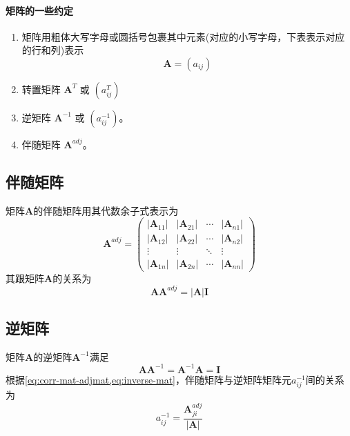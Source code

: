 \paragraph*{矩阵的一些约定}
\begin{enumerate}
    \item 矩阵用粗体大写字母或圆括号包裹其中元素(对应的小写字母，下表表示对应的行和列)表示
        \begin{equation}
            \bm{A} = (a_{ij})
        \end{equation}
    \item 转置矩阵 $\bm{A}^{T}$ 或 $(a^{T}_{ij})$
    \item 逆矩阵 $\bm{A}^{-1}$ 或 $(a^{-1}_{ij})$。
    \item 伴随矩阵 $\bm{A}^{adj}$。
\end{enumerate}

\subsection{伴随矩阵}
矩阵$\bm{A}$的伴随矩阵用其代数余子式表示为
\begin{equation}
    \bm{A}^{adj} = \begin{pmatrix}
        |\bm{A}_{11}| & |\bm{A}_{21}| & \cdots & |\bm{A}_{n1}| \\
        |\bm{A}_{12}| & |\bm{A}_{22}| & \cdots & |\bm{A}_{n2}| \\
        \vdots        & \vdots        & \ddots & \vdots        \\
        |\bm{A}_{1n}| & |\bm{A}_{2n}| & \cdots & |\bm{A}_{nn}|
    \end{pmatrix}
    \label{eq:adjoint-mat}
\end{equation}
其跟矩阵$\bm{A}$的关系为
\begin{equation}
    \bm{A}\bm{A}^{adj} = |\bm{A}|\bm{I}
    \label{eq:corr-mat-adjmat}
\end{equation}

\subsection{逆矩阵}
矩阵$\bm{A}$的逆矩阵$\bm{A}^{-1}$满足
\begin{equation}
    \bm{A}\bm{A}^{-1} = \bm{A}^{-1}\bm{A} = \bm{I}
    \label{eq:inverse-mat}
\end{equation}
根据\cref{eq:corr-mat-adjmat,eq:inverse-mat}，伴随矩阵与逆矩阵矩阵元$a^{-1}_{ij}$间的关系为
\begin{equation}\boxed{
        a^{-1}_{ij} = \frac{\bm{A}^{adj}_{ji}}{|\bm{A}|}
    \label{eq:corr-adjmat-invmat}
}\end{equation}

